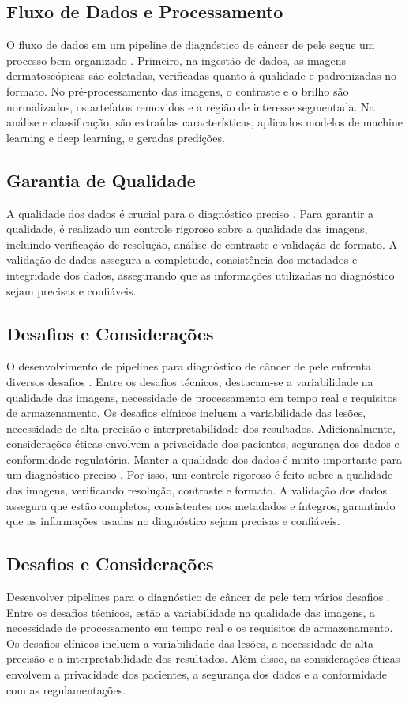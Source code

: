\subsection{Fluxo de Dados e Processamento}
O fluxo de dados em um pipeline de diagnóstico de câncer de pele segue um processo bem organizado \cite{wang2023automated}. Primeiro, na ingestão de dados, as imagens dermatoscópicas são coletadas, verificadas quanto à qualidade e padronizadas no formato. No pré-processamento das imagens, o contraste e o brilho são normalizados, os artefatos removidos e a região de interesse segmentada. Na análise e classificação, são extraídas características, aplicados modelos de machine learning e deep learning, e geradas predições.
\subsection{Garantia de Qualidade}
A qualidade dos dados é crucial para o diagnóstico preciso \cite{smith2023quality}. Para garantir a qualidade, é realizado um controle rigoroso sobre a qualidade das imagens, incluindo verificação de resolução, análise de contraste e validação de formato. A validação de dados assegura a completude, consistência dos metadados e integridade dos dados, assegurando que as informações utilizadas no diagnóstico sejam precisas e confiáveis.
\subsection{Desafios e Considerações}
O desenvolvimento de pipelines para diagnóstico de câncer de pele enfrenta diversos desafios \cite{chen2023challenges}. Entre os desafios técnicos, destacam-se a variabilidade na qualidade das imagens, necessidade de processamento em tempo real e requisitos de armazenamento. Os desafios clínicos incluem a variabilidade das lesões, necessidade de alta precisão e interpretabilidade dos resultados. Adicionalmente, considerações éticas envolvem a privacidade dos pacientes, segurança dos dados e conformidade regulatória.
Manter a qualidade dos dados é muito importante para um diagnóstico preciso \cite{smith2023quality}. Por isso, um controle rigoroso é feito sobre a qualidade das imagens, verificando resolução, contraste e formato. A validação dos dados assegura que estão completos, consistentes nos metadados e íntegros, garantindo que as informações usadas no diagnóstico sejam precisas e confiáveis.
\subsection{Desafios e Considerações}
Desenvolver pipelines para o diagnóstico de câncer de pele tem vários desafios \cite{chen2023challenges}. Entre os desafios técnicos, estão a variabilidade na qualidade das imagens, a necessidade de processamento em tempo real e os requisitos de armazenamento. Os desafios clínicos incluem a variabilidade das lesões, a necessidade de alta precisão e a interpretabilidade dos resultados. Além disso, as considerações éticas envolvem a privacidade dos pacientes, a segurança dos dados e a conformidade com as regulamentações.



